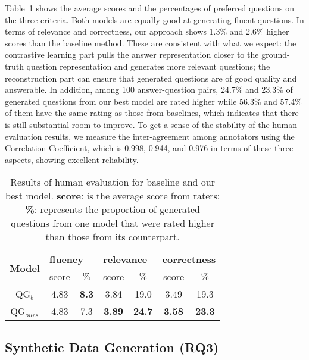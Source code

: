 \documentclass[11pt]{article}
\begin{document}
\noindent Table~\ref{tab:human-evaluation} shows the average scores and the percentages of preferred questions on the three criteria.
Both models are equally good at generating fluent questions.
In terms of relevance and correctness, our approach shows 1.3\% and 2.6\% higher scores than the baseline method. These are consistent with what we expect: the contrastive learning part pulls the answer representation closer to the ground-truth question representation and generates more relevant questions; the reconstruction part can ensure that generated questions are of good quality and answerable.
In addition, among 100 answer-question pairs, 24.7\% and 23.3\% of generated questions from our best model are rated higher while 56.3\% and 57.4\% of them have the same rating as those from baselines, which indicates that there is still substantial room to improve.
To get a sense of the stability of the human evaluation results, we measure the inter-agreement among annotators using the Correlation Coefficient, which is 0.998, 0.944, and 0.976 in terms of these three aspects, showing excellent reliability.

\begin{table}[htbp!]
\centering\small
\begin{tabular}{ccccccc}
\hline
\multirow{2}{*}{\textbf{Model}} & \multicolumn{2}{l}{\textbf{fluency}} & \multicolumn{2}{l}{\textbf{relevance}} & \multicolumn{2}{l}{\textbf{correctness}}  \\
                       & score & $\%$ & score & $\%$ & score & $\%$ \\ 
\hline
QG$_{b}$ & 4.83 & \textbf{8.3} & 3.84 & 19.0 & 3.49 & 19.3 \\
QG$_{ours}$ & 4.83 & 7.3 & \textbf{3.89} & \textbf{24.7} & \textbf{3.58} & \textbf{23.3}  \\
\hline
\end{tabular}
\caption{Results of human evaluation for baseline and our best model. \textbf{score}: is the average score from raters; \textbf{\%}: represents the proportion of generated questions from one model that were rated higher than those from its counterpart. }
\label{tab:human-evaluation}
\end{table}
\vspace{-0.3cm}





\subsection{Synthetic Data Generation (RQ3)}
\end{document}

